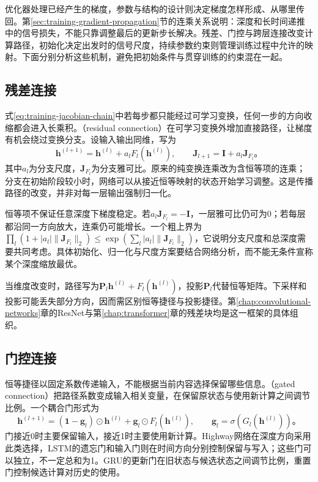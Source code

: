 优化器处理已经产生的梯度，参数与结构的设计则决定梯度怎样形成、从哪里传回。第\ref{sec:training-gradient-propagation}节的连乘关系说明：深度和长时间递推中的信号损失，不能只靠调整最后的更新步长解决。残差、门控与跨层连接改变计算路径，初始化决定出发时的信号尺度，持续参数约束则管理训练过程中允许的映射。下面分别分析这些机制，避免把初始条件与贯穿训练的约束混在一起。

\subsection{残差连接}
\label{sec:training-residual}

式\eqref{eq:training-jacobian-chain}中若每步都只能经过可学习变换，任何一步的方向收缩都会进入长乘积。（residual connection）在可学习变换外增加直接路径，让梯度有机会绕过变换分支。设输入输出同维，写为
\begin{equation}
  \bm h^{(l+1)}=\bm h^{(l)}+a_lF_l(\bm h^{(l)}),\qquad
  \bm J_{l+1}=\bm I+a_l\bm J_{F_l}\text{。}
  \label{eq:training-residual-jacobian}
\end{equation}
其中$a_l$为分支尺度，$\bm J_{F_l}$为分支雅可比。原来的纯变换连乘改为含恒等项的连乘；分支在初始阶段较小时，网络可以从接近恒等映射的状态开始学习调整。这是传播路径的改变，并非对每一层输出强制归一化。

恒等项不保证任意深度下梯度稳定。若$a_l\bm J_{F_l}=-\bm I$，一层雅可比仍可为0；若每层都沿同一方向放大，连乘仍可能增长。一个粗上界为$\prod_l(1+|a_l|\lVert\bm J_{F_l}\rVert_2)\leq\exp(\sum_l|a_l|\lVert\bm J_{F_l}\rVert_2)$，它说明分支尺度和总深度需要共同考虑。具体初始化、归一化与尺度方案要结合网络分析，而不能无条件宣称某个深度缩放最优。

当维度改变时，路径写为$\bm P_l\bm h^{(l)}+F_l(\bm h^{(l)})$，投影$\bm P_l$代替恒等矩阵。下采样和投影可能丢失部分方向，因而需区别恒等捷径与投影捷径。第\ref{chap:convolutional-networks}章的ResNet与第\ref{chap:transformer}章的残差块均是这一框架的具体组织。

\subsection{门控连接}
\label{sec:training-gates}

恒等捷径以固定系数传递输入，不能根据当前内容选择保留哪些信息。（gated connection）把路径系数变成输入相关变量，在保留原状态与使用新计算之间调节比例。一个耦合门形式为
\begin{equation}
  \bm h^{(l+1)}=(\bm1-\bm g_l)\odot\bm h^{(l)}
                   +\bm g_l\odot F_l(\bm h^{(l)}),
  \qquad\bm g_l=\sigma(G_l(\bm h^{(l)}))\text{。}
  \label{eq:training-gated-connection}
\end{equation}
门接近0时主要保留输入，接近1时主要使用新计算。Highway网络在深度方向采用此类选择，LSTM的遗忘门和输入门则在时间方向分别控制保留与写入；这些门可以独立，不一定总和为1。GRU的更新门在旧状态与候选状态之间调节比例，重置门控制候选计算对历史的使用。

